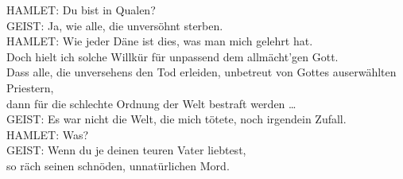 \begin{playdialog}
HAMLET: Du bist in Qualen?\\

GEIST: Ja, wie alle, die unversöhnt sterben.\\

HAMLET: Wie jeder Däne ist dies, was man mich gelehrt hat.\\
Doch hielt ich solche Willkür für unpassend dem allmächt’gen Gott.\\
Dass alle, die unversehens den Tod erleiden, unbetreut von Gottes auserwählten Priestern,\\
dann für die schlechte Ordnung der Welt bestraft werden … \\

GEIST: Es war nicht die Welt, die mich tötete, noch irgendein Zufall.\\

HAMLET: Was?\\

GEIST: Wenn du je deinen teuren Vater liebtest,\\
so räch seinen schnöden, unnatürlichen Mord.\\


\end{playdialog}
